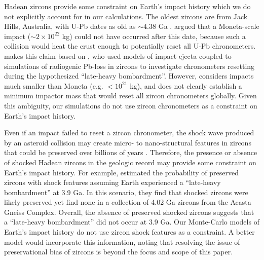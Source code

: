 \documentclass[manuscript]{aastex63}
\begin{document}
Hadean zircons provide some constraint on Earth's impact history which we do not explicitly account for in our calculations. The oldest zircons are from Jack Hills, Australia, with U-Pb dates as old as $\sim 4.38$ Ga \citep{Valley_2014}. \citet{Benner_2020} argued that a Moneta-scale impact ($\sim 2 \times 10^{22}$ kg) could not have occurred after this date, because such a collision would heat the crust enough to potentially reset all U-Pb chronometers. \citet{Benner_2020} makes this claim based on \citet{Abramov_2013}, who used models of impact ejecta coupled to simulations of radiogenic Pb-loss in zircons to investigate chronometers resetting during the hypothesized ``late-heavy bombardment''. However, \citet{Abramov_2013} considers impacts much smaller than Moneta (e.g. $< 10^{21}$ kg), and does not clearly establish a minimum impactor mass that would reset all zircon chronometers globally. Given this ambiguity, our simulations do not use zircon chronometers as a constraint on Earth's impact history.

Even if an impact failed to reset a zircon chronometer, the shock wave produced by an asteroid collision may create micro- to nano-structural features in zircons that could be preserved over billions of years \citep{Reimink_2023}. Therefore, the presence or absence of shocked Hadean zircons in the geologic record may provide some constraint on Earth's impact history. For example, \citet{Reimink_2023} estimated the probability of preserved zircons with shock features assuming Earth experienced a ``late-heavy bombardment'' at 3.9 Ga. In this scenario, they find that shocked zircons were likely preserved yet find none in a collection of 4.02 Ga zircons from the Acasta Gneiss Complex. Overall, the absence of preserved shocked zircons suggests that a ``late-heavy bombardment'' did not occur at 3.9 Ga. Our Monte-Carlo models of Earth's impact history do not use zircon shock features as a constraint. A better model would incorporate this information, noting that resolving the issue of preservational bias of zircons is beyond the focus and scope of this paper.
\end{document}
